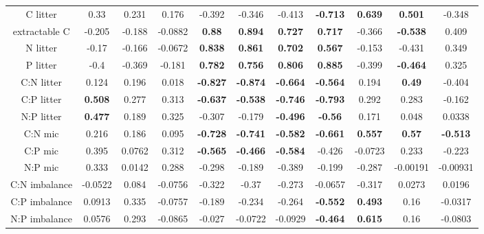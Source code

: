 \documentclass[authoryear,preprint,review,12pt]{elsarticle}
\begin{document}
\begin{table}[h!]
\begin{center}
{\begin{tabular}{ccccccccccc}
  C litter & 0.33 & 0.231 & 0.176 & -0.392 & -0.346 & -0.413 & \textbf{ -0.713 } & \textbf{ 0.639 } & \textbf{ 0.501 } & -0.348 \\ 
  extractable C & -0.205 & -0.188 & -0.0882 & \textbf{ 0.88 } & \textbf{ 0.894 } & \textbf{ 0.727 } & \textbf{ 0.717 } & -0.366 & \textbf{ -0.538 } & 0.409 \\ 
  N litter & -0.17 & -0.166 & -0.0672 & \textbf{ 0.838 } & \textbf{ 0.861 } & \textbf{ 0.702 } & \textbf{ 0.567 } & -0.153 & -0.431 & 0.349 \\ 
  P litter & -0.4 & -0.369 & -0.181 & \textbf{ 0.782 } & \textbf{ 0.756 } & \textbf{ 0.806 } & \textbf{ 0.885 } & -0.399 & \textbf{ -0.464 } & 0.325 \\ 
  C:N litter & 0.124 & 0.196 & 0.018 & \textbf{ -0.827 } & \textbf{ -0.874 } & \textbf{ -0.664 } & \textbf{ -0.564 } & 0.194 & \textbf{ 0.49 } & -0.404 \\ 
  C:P litter & \textbf{ 0.508 } & 0.277 & 0.313 & \textbf{ -0.637 } & \textbf{ -0.538 } & \textbf{ -0.746 } & \textbf{ -0.793 } & 0.292 & 0.283 & -0.162 \\ 
  N:P litter & \textbf{ 0.477 } & 0.189 & 0.325 & -0.307 & -0.179 & \textbf{ -0.496 } & \textbf{ -0.56 } & 0.171 & 0.048 & 0.0338 \\ 
  C:N mic & 0.216 & 0.186 & 0.095 & \textbf{ -0.728 } & \textbf{ -0.741 } & \textbf{ -0.582 } & \textbf{ -0.661 } & \textbf{ 0.557 } & \textbf{ 0.57 } & \textbf{ -0.513 } \\ 
  C:P mic & 0.395 & 0.0762 & 0.312 & \textbf{ -0.565 } & \textbf{ -0.466 } & \textbf{ -0.584 } & -0.426 & -0.0723 & 0.233 & -0.223 \\ 
  N:P mic & 0.333 & 0.0142 & 0.288 & -0.298 & -0.189 & -0.389 & -0.199 & -0.287 & -0.00191 & -0.00931 \\ 
  C:N imbalance & -0.0522 & 0.084 & -0.0756 & -0.322 & -0.37 & -0.273 & -0.0657 & -0.317 & 0.0273 & 0.0196 \\ 
  C:P imbalance & 0.0913 & 0.335 & -0.0757 & -0.189 & -0.234 & -0.264 & \textbf{ -0.552 } & \textbf{ 0.493 } & 0.16 & -0.0317 \\ 
  N:P imbalance & 0.0576 & 0.293 & -0.0865 & -0.027 & -0.0722 & -0.0929 & \textbf{ -0.464 } & \textbf{ 0.615 } & 0.16 & -0.0803 \\ 
   \hline
\end{tabular}
}
\end{center}
\end{table}
\end{document}
